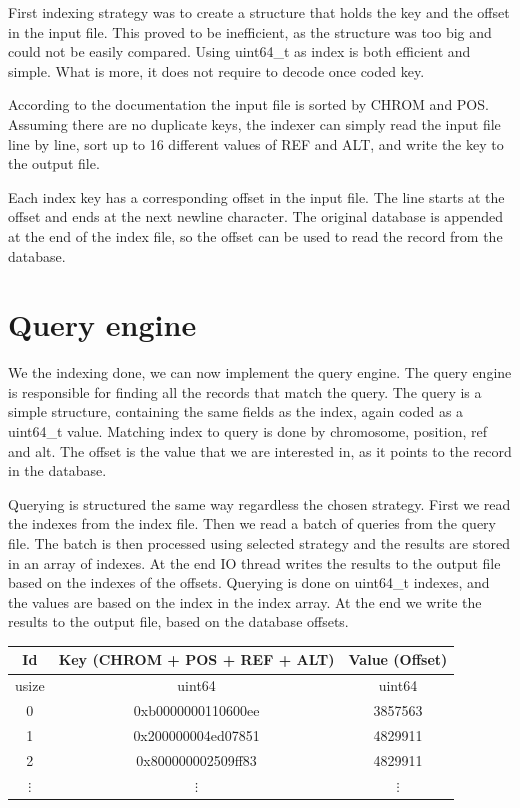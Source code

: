 \documentclass[a4paper,12pt]{article}
\begin{document}
    First indexing strategy was to create a structure that holds the key and the offset in the input file.
    This proved to be inefficient, as the structure was too big and could not be easily compared.
    Using uint64\_t as index is both efficient and simple.
    What is more, it does not require to decode once coded key.

    According to the documentation the input file is sorted by CHROM and POS.
    Assuming there are no duplicate keys, the indexer can simply read the input file line by line,
    sort up to 16 different values of REF and ALT, and write the key to the output file.

    Each index key has a corresponding offset in the input file.
    The line starts at the offset and ends at the next newline character.
    The original database is appended at the end of the index file,
    so the offset can be used to read the record from the database.


    \section{Query engine}

    We the indexing done, we can now implement the query engine.
    The query engine is responsible for finding all the records that match the query.
    The query is a simple structure, containing the same fields as the index, again coded
    as a uint64\_t value.
    Matching index to query is done by chromosome, position, ref and alt.
    The offset is the value that we are interested in, as it points to the record in the database.

    Querying is structured the same way regardless the chosen strategy.
    First we read the indexes from the index file.
    Then we read a batch of queries from the query file.
    The batch is then processed using selected strategy and the results
    are stored in an array of indexes. At the end IO thread writes the results to the output file
    based on the indexes of the offsets. Querying is done on uint64\_t indexes,
    and the values are based on the index in the index array. At the end we write the results to the output file,
    based on the database offsets.

    \begin{center}
        \begin{tabular}{||c || c | c||}
            \hline
            Id       & Key (CHROM + POS + REF + ALT) & Value (Offset) \\
            \hline
            usize    & uint64                        & uint64         \\
            \hline\hline
            0        & 0xb0000000110600ee            & 3857563        \\
            1        & 0x200000004ed07851            & 4829911        \\
            2        & 0x800000002509ff83            & 4829911        \\
            $\vdots$ & $\vdots$                      & $\vdots$       \\
            \hline
        \end{tabular}
    \end{center}
\end{document}
